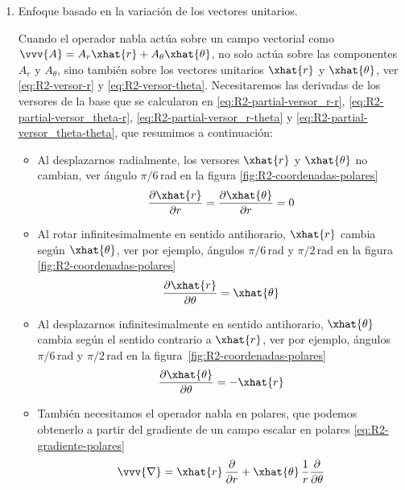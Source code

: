 \begin{enumerate}
\item Enfoque basado en la variación de los vectores unitarios.
  
  Cuando el operador nabla actúa sobre un campo vectorial como
  $\vvv{A} = A_r\xhat{r}+A_\theta\xhat{\theta}$, no solo actúa sobre las componentes
  $A_r$ y $A_\theta$, sino también sobre los vectores unitarios $\xhat{r}$ y
  $\xhat{\theta}$,
  ver \eqref{eq:R2-versor-r} y \eqref{eq:R2-versor-theta}. Necesitaremos las derivadas
  de los versores de la base que se calcularon en \eqref{eq:R2-partial-versor_r-r},
  \eqref{eq:R2-partial-versor_theta-r}, \eqref{eq:R2-partial-versor_r-theta} y
  \eqref{eq:R2-partial-versor_theta-theta}, que resumimos a continuación:
  \begin{itemize}
  \item Al desplazarnos radialmente, los versores $\xhat{r}$ y $\xhat{\theta}$ no
    cambian, ver ángulo $\pi/6$\,\unit{\radian} en la figura
    \ref{fig:R2-coordenadas-polares}
    \begin{equation}
      \dfrac{\partial\xhat{r}}{\partial r} = \dfrac{\partial\xhat{\theta}}{\partial r}
      = 0
    \end{equation}
  \item Al rotar infinitesimalmente en sentido antihorario, $\xhat{r}$ cambia según
    $\xhat{\theta}$, ver por ejemplo, ángulos $\pi/6$\,\unit{\radian} y
    $\pi/2$\,\unit{\radian} en la figura \ref{fig:R2-coordenadas-polares}
    \begin{equation}
      \dfrac{\partial\xhat{r}}{\partial\theta} = \xhat{\theta}
    \end{equation}
  \item Al desplazarnos infinitesimalmente en sentido antihorario, $\xhat{\theta}$ cambia
    según el sentido contrario a $\xhat{r}$, ver por ejemplo, ángulos
    $\pi/6$\,\unit{\radian} y $\pi/2$\,\unit{\radian} en la
    figura~\ref{fig:R2-coordenadas-polares}
    \begin{equation}
      \dfrac{\partial\xhat{\theta}}{\partial\theta} = -\xhat{r}
    \end{equation}
    
  \item También necesitamos el operador nabla en polares, que podemos obtenerlo a
    partir del gradiente de un campo escalar en polares \eqref{eq:R2-gradiente-polares}
    \begin{equation}
      \vvv{\nabla}
      = \xhat{r}\,\dfrac{\partial}{\partial r}
      + \xhat{\theta}\,\dfrac{1}{r}\dfrac{\partial}{\partial\theta}
    \end{equation}
  \end{itemize}
  

\end{enumerate}
